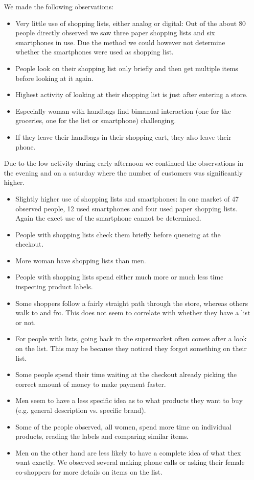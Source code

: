 \documentclass{scrartcl}
\begin{document}
      We made the following observations:
      \begin{itemize}
        \item Very little use of shopping lists, either analog or digital: Out of the about 80 people directly observed we saw three paper shopping lists and six smartphones in use. Due the method we could however not determine whether the smartphones were used as shopping list.
        \item People look on their shopping list only briefly and then get multiple items before looking at it again.
        \item Highest activity of looking at their shopping list is just after entering a store.
        \item Especially woman with handbags find bimanual interaction (one for the groceries, one for the list or smartphone) challenging.
        \item If they leave their handbags in their shopping cart, they also leave their phone.
      \end{itemize}

      Due to the low activity during early afternoon we continued the observations in the evening and on a saturday where the number of customers was significantly higher.
      \begin{itemize}
        \item Slightly higher use of shopping lists and smartphones: In one market of 47 observed people, 12 used smartphones and four used paper shopping lists. Again the exect use of the smartphone cannot be determined.
        \item People with shopping lists check them briefly before queueing at the checkout.
        \item More woman have shopping lists than men.
        \item People with shopping lists spend either much more or much less time inspecting product labels.
        \item Some shoppers follow a fairly straight path through the store, whereas others walk to and fro. This does not seem to correlate with whether they have a list or not.
        \item For people with lists, going back in the supermarket often comes after a look on the list. This may be because they noticed they forgot something on their list.
        \item Some people spend their time waiting at the checkout already picking the correct amount of money to make payment faster.
        \item Men seem to have a less specific idea as to what products they want to buy (e.g. general description vs. specific brand).
        \item Some of the people observed, all women, spend more time on individual products, reading the labels and comparing similar items.
        \item Men on the other hand are less likely to have a complete idea of what thex want exactly. 
          We observed several making phone calls or asking their female co-shoppers for more details on items on the list. 
      \end{itemize}
\end{document}

